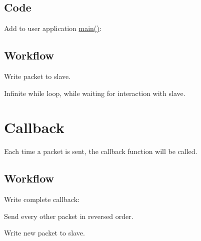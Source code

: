 \hypertarget{asfdoc_sam0_sercom_i2c_master_callback_use_case_asfdoc_sam0_sercom_i2c_master_callback_use_case_code}{}\subsection{Code}\label{asfdoc_sam0_sercom_i2c_master_callback_use_case_asfdoc_sam0_sercom_i2c_master_callback_use_case_code}
Add to user application {\ttfamily \mbox{\hyperlink{csc__app_8c_a840291bc02cba5474a4cb46a9b9566fe}{main()}}}\+: 
\begin{DoxyCodeInclude}{0}
\end{DoxyCodeInclude}
\hypertarget{asfdoc_sam0_sercom_i2c_master_callback_use_case_asfdoc_sam0_sercom_i2c_master_callback_use_case_implementation_workflow}{}\subsection{Workflow}\label{asfdoc_sam0_sercom_i2c_master_callback_use_case_asfdoc_sam0_sercom_i2c_master_callback_use_case_implementation_workflow}

\begin{DoxyEnumerate}
\item Write packet to slave. 
\begin{DoxyCodeInclude}{0}
\end{DoxyCodeInclude}

\item Infinite while loop, while waiting for interaction with slave. 
\begin{DoxyCodeInclude}{0}
\end{DoxyCodeInclude}
 
\end{DoxyEnumerate}\hypertarget{asfdoc_sam0_sercom_i2c_master_callback_use_case_asfdoc_sam0_sercom_i2c_master_callback_use_case_callback}{}\section{Callback}\label{asfdoc_sam0_sercom_i2c_master_callback_use_case_asfdoc_sam0_sercom_i2c_master_callback_use_case_callback}
Each time a packet is sent, the callback function will be called.\hypertarget{asfdoc_sam0_sercom_i2c_master_callback_use_case_asfdoc_sam0_sercom_i2c_master_callback_use_case_callback_workflow}{}\subsection{Workflow}\label{asfdoc_sam0_sercom_i2c_master_callback_use_case_asfdoc_sam0_sercom_i2c_master_callback_use_case_callback_workflow}

\begin{DoxyItemize}
\item Write complete callback\+:
\begin{DoxyEnumerate}
\item Send every other packet in reversed order. 
\begin{DoxyCodeInclude}{0}
\end{DoxyCodeInclude}

\item Write new packet to slave. 
\begin{DoxyCodeInclude}{0}
\end{DoxyCodeInclude}

\end{DoxyEnumerate}
\end{DoxyItemize}